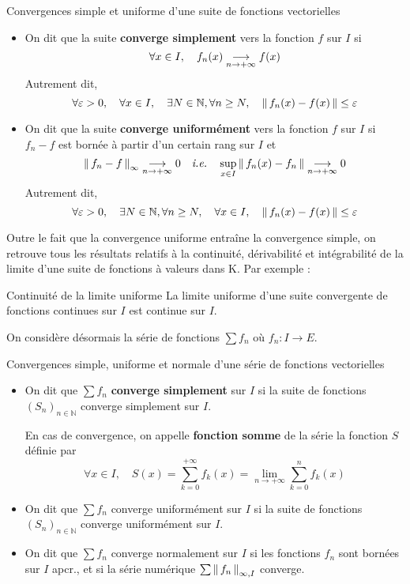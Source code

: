     \begin{defi}{Convergences simple et uniforme d’une suite de fonctions vectorielles}{}
        \begin{itemize}
            \item On dit que la suite \textbf{converge simplement} vers la fonction $f$ sur $I$ si 
            \[ \forall x \in I, \quad f_n(x) \limi{n}{+\infty} f(x) \]   
            Autrement dit,
            \[ \forall \varepsilon > 0, \quad \forall x \in I, \quad \exists N \in \mathbb{N}, \forall n \geq N, \quad \norm{f_n(x) - f(x)} \leq \varepsilon \]
            \item On dit que la suite \textbf{converge uniformément} vers la fonction $f$ sur $I$ si $f_n - f$ est bornée à partir d’un certain rang sur $I$ et 
            \[ \nnorm{\infty}{f_n - f} \limi{n}{+\infty} 0 \esp{\textit{i.e.}} \sup_{x \in I} \norm{f_n(x) - f_n} \limi{n}{+\infty} 0 \]    
            Autrement dit,
            \[ \forall \varepsilon > 0, \quad \exists N \in \mathbb{N}, \forall n \geq N, \quad \forall x \in I, \quad \norm{f_n(x) - f(x)} \leq \varepsilon \]
        \end{itemize}
    \end{defi}

    Outre le fait que la convergence uniforme entraîne la convergence simple, on retrouve tous les résultats relatifs à la continuité, dérivabilité et intégrabilité de la limite d’une suite de fonctions à valeurs dans K. Par exemple :

    \begin{theo}{Continuité de la limite uniforme}{}
        La limite uniforme d’une suite convergente de fonctions continues sur $I$ est continue sur $I$.
    \end{theo}

    On considère désormais la série de fonctions $\sum f_n$ où $f_n : I \to E$.

    \begin{defi}{Convergences simple, uniforme et normale d’une série de fonctions vectorielles}{}
        \begin{itemize}
            \item On dit que $\sum f_n$ \textbf{converge simplement} sur $I$ si la suite de fonctions $(S_n)_{n \in \mathbb{N}}$ converge simplement sur $I$. 
            
            En cas de convergence, on appelle \textbf{fonction somme} de la série la fonction $S$ définie par 
            \[ \forall x \in I, \quad S(x) = \sum_{k=0}^{+\infty} f_k(x) = \lim_{n \to +\infty} \sum_{k=0}^{n} f_k(x) \]  
            \item On dit que $\sum f_n$ converge uniformément sur $I$ si la suite de fonctions $(S_n)_{n \in \mathbb{N}}$ converge uniformément sur $I$.
            \item On dit que $\sum f_n$ converge normalement sur $I$ si les fonctions $f_n$ sont bornées sur $I$ apcr., et si la série numérique $\sum \nnorm{\infty,I}{f_n}$ converge.
        \end{itemize}
    \end{defi}

